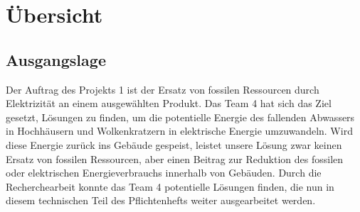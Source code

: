 \section{Übersicht} \label{sec:uebersicht}
\subsection{Ausgangslage}
Der Auftrag des Projekts 1 ist der Ersatz von fossilen Ressourcen durch Elektrizität an einem ausgewählten Produkt. Das Team 4 hat sich das Ziel gesetzt, Lösungen zu finden, um die potentielle Energie des fallenden Abwassers in Hochhäusern und Wolkenkratzern in elektrische Energie umzuwandeln. Wird diese Energie zurück ins Gebäude gespeist, leistet unsere Lösung zwar keinen Ersatz von fossilen Ressourcen, aber einen Beitrag zur Reduktion des fossilen oder elektrischen Energieverbrauchs innerhalb von Gebäuden.
Durch die Recherchearbeit konnte das Team 4 potentielle Lösungen finden, die nun in diesem technischen Teil des Pflichtenhefts weiter ausgearbeitet werden.
\renewcommand\arraystretch{2}
